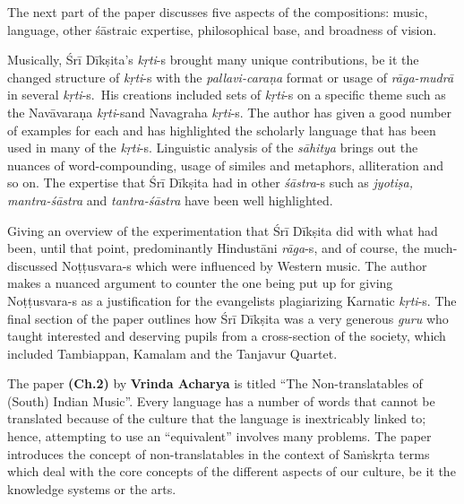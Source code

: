 The next part of the paper discusses five aspects of the compositions: music, language, other śāstraic expertise, philosophical base, and broadness of vision.

Musically, Śrī Dīkṣita’s \textit{kṛti}-s brought many unique contributions, be it the changed structure of \textit{kṛti}-s with the \textit{pallavi-caraṇa} format or usage of \textit{rāga-mudrā} in several \textit{kṛti}-s.~His creations included sets of \textit{kṛti}-s on a specific theme such as the Navāvaraṇa \textit{kṛti}-s\break and Navagraha \textit{kṛti}-s. The author has given a good number of examples for each and has highlighted the scholarly language that has been used in many of the \textit{kṛti}-s. Linguistic analysis of the \textit{sāhitya} brings out the nuances of word-compounding, usage of similes and metaphors, alliteration and so on. The expertise that Śrī Dīkṣita had in other \textit{śāstra}-s such as \textit{jyotiṣa, mantra-śāstra} and \textit{tantra-śāstra} have been well highlighted.

Giving an overview of the experimentation that Śrī Dīkṣita did with what had been, until that point, predominantly Hindustāni \textit{rāga}-s, and of course, the much-discussed Noṭṭusvara-s which were influenced by Western music. The author makes a nuanced argument to counter the one being put up for giving Noṭṭusvara-s as a justification for the evangelists plagiarizing Karnatic \textit{kṛti}-s. The final section of the paper outlines how Śrī Dīkṣita was a very generous \textit{guru} who taught interested and deserving pupils from a cross-section of the society, which included Tambiappan, Kamalam and the Tanjavur Quartet.

The paper \textbf{(Ch.2)} by \textbf{Vrinda Acharya} is titled “The Non-translatables of (South) Indian Music”. Every language has a number of words that cannot be translated because of the culture that the language is inextricably linked to; hence, attempting to use an “equivalent” involves many problems. The paper introduces the concept of non-translatables in the context of Saṁskṛta terms which deal with the core concepts of the different aspects of our culture, be it the knowledge systems or the arts.

